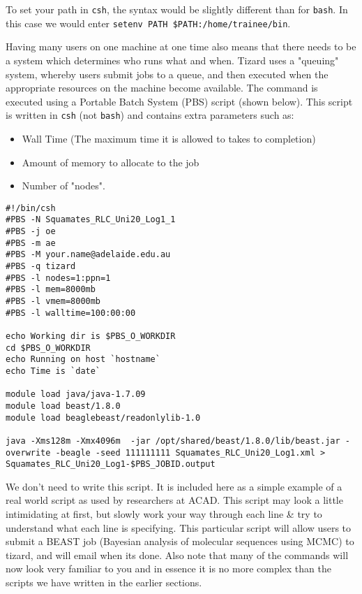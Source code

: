 To set your path in \texttt{csh}, the syntax would be slightly different than for \texttt{bash}.
In this case we would enter \texttt{setenv PATH \$PATH:/home/trainee/bin}.

\begin{information}
Having many users on one machine at one time also means that there needs to be a system which determines who runs what and when. 
Tizard uses a "queuing" system, whereby users submit jobs to a queue, and then executed when the appropriate resources on the machine become available. 
The command is executed using a Portable Batch System (PBS) script (shown below). 
This script is written in \texttt{csh} (not \texttt{bash}) and contains extra parameters such as:

\begin{itemize}
\item Wall Time (The maximum time it is allowed to takes to completion)
\item Amount of memory to allocate to the job
\item Number of "nodes". 
\end{itemize}

\begin{lstlisting}
#!/bin/csh
#PBS -N Squamates_RLC_Uni20_Log1_1
#PBS -j oe
#PBS -m ae
#PBS -M your.name@adelaide.edu.au
#PBS -q tizard
#PBS -l nodes=1:ppn=1
#PBS -l mem=8000mb
#PBS -l vmem=8000mb
#PBS -l walltime=100:00:00

echo Working dir is $PBS_O_WORKDIR
cd $PBS_O_WORKDIR
echo Running on host `hostname`
echo Time is `date`

module load java/java-1.7.09
module load beast/1.8.0
module load beaglebeast/readonlylib-1.0

java -Xms128m -Xmx4096m  -jar /opt/shared/beast/1.8.0/lib/beast.jar -overwrite -beagle -seed 111111111 Squamates_RLC_Uni20_Log1.xml > Squamates_RLC_Uni20_Log1-$PBS_JOBID.output
\end{lstlisting}

We don't need to write this script.
It is included here as a simple example of a real world script as used by researchers at ACAD.
This script may look a little intimidating at first, but slowly work your way through each line \& try to understand what each line is specifying.
This particular script will allow users to submit a BEAST job (Bayesian analysis of molecular sequences using MCMC) to tizard, and will email when its done.
Also note that many of the commands will now look very familiar to you and in essence it is no more complex than the scripts we have written in the earlier sections.
\end{information}
